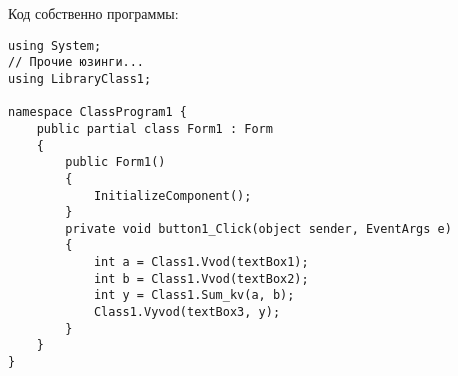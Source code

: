 \documentclass{article}
\begin{document}
Код собственно программы:

\begin{verbatim}
using System;
// Прочие юзинги...
using LibraryClass1;

namespace ClassProgram1 {
    public partial class Form1 : Form
    {
        public Form1()
        {
            InitializeComponent();
        }
        private void button1_Click(object sender, EventArgs e)
        {
            int a = Class1.Vvod(textBox1);
            int b = Class1.Vvod(textBox2);
            int y = Class1.Sum_kv(a, b);
            Class1.Vyvod(textBox3, y);
        }
    }
}
\end{verbatim}
\end{document}
